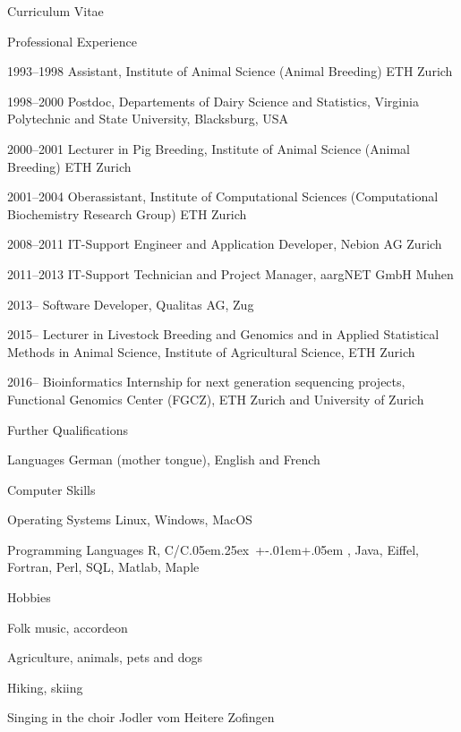\documentclass[11pt,a4paper]{scrartcl}
\newcommand{\ccplusplus}{{\sffamily\smaller C/{C}\hbox{\kern.05em\raise.25ex%
  \hbox{+\kern-.01em+}\kern.05em}\spacefactor=1000 }}
\begin{document}
\begin{cv}{Curriculum Vitae}
  \begin{cvlist}{Professional Experience}
  \item[1993--1998]  Assistant, Institute of Animal Science (Animal Breeding) ETH Zurich
  \item[1998--2000]  Postdoc, Departements of Dairy Science and Statistics, Virginia Polytechnic and State University, Blacksburg, USA
  \item[2000--2001]  Lecturer in Pig Breeding, Institute of Animal Science (Animal Breeding) ETH Zurich
  \item[2001--2004]  Oberassistant, Institute of Computational Sciences 
	(Computational Biochemistry Research Group) ETH Zurich
  \item[2008--2011]  IT-Support Engineer and Application Developer, Nebion AG Zurich
  \item[2011--2013]  IT-Support Technician and Project Manager, aargNET GmbH Muhen
  \item[2013--]      Software Developer, Qualitas AG, Zug
  \item[2015--]      Lecturer in Livestock Breeding and Genomics and in Applied Statistical Methods in Animal Science, Institute of Agricultural Science, ETH Zurich
  \item[2016--]      Bioinformatics Internship for next generation sequencing projects, Functional Genomics Center (FGCZ), ETH Zurich and University of Zurich
  \end{cvlist}

  \begin{cvlist}{Further Qualifications}
  \item[Languages] German (mother tongue), English and French
  \end{cvlist}

\pagebreak

  \begin{cvlist}{Computer Skills}
  \item[Operating Systems] Linux, Windows, MacOS
  \item[Programming Languages] R, \ccplusplus, Java, Eiffel, Fortran, 
	Perl, SQL, Matlab, Maple
  \end{cvlist}

  \vspace{-1.5ex}
  \begin{cvlist}{Hobbies}
  \item Folk music, accordeon \vspace{-1ex}
  \item Agriculture, animals, pets and dogs \vspace{-1ex}
  \item Hiking, skiing  \vspace{-1ex}
  \item Singing in the choir Jodler vom Heitere Zofingen\vspace{-1ex}
  \end{cvlist}




\end{cv}
\end{document}

